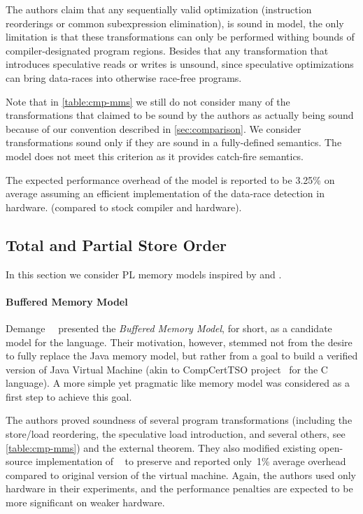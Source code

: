 The authors claim that any sequentially valid optimization 
(\eg instruction reorderings or common subexpression elimination),
is sound in \DRFx model, the only limitation is that
these transformations can only be performed
withing bounds of compiler-designated program regions.
Besides that any transformation that introduces 
speculative reads or writes is unsound,
since speculative optimizations can bring
data-races into otherwise race-free programs.

Note that in \cref{table:cmp-mms} we still do not consider 
many of the transformations that claimed to be sound by the authors
as actually being sound because of our convention described in \cref{sec:comparison}.
We consider transformations sound only if they are 
sound in a fully-defined semantics. 
The \DRFx model does not meet this criterion as 
it provides catch-fire semantics.

The expected performance overhead of the model 
is reported to be 3.25\% on average
assuming an efficient implementation 
of the data-race detection in hardware. 
(compared to stock compiler and \Intel hardware). 

\subsection{Total and Partial Store Order}

In this section we consider PL memory models 
inspired by \TSO and \PSO.  

\paragraph{Buffered Memory Model}

Demange~\etal~\cite{Demange-al:POPL13} presented 
the \emph{Buffered Memory Model}, \BMM for short,
as a candidate model for the \Java language.
Their motivation, however, stemmed not from the desire 
to fully replace the Java memory model, but rather 
from a goal to build a verified version of 
Java Virtual Machine (akin to CompCertTSO 
project~\cite{Sevcik-al:JACM13} for the C language).
A more simple yet pragmatic \TSO like memory model 
was considered as a first step to achieve this goal. 

The authors proved soundness of several program transformations
(including the store/load reordering, the speculative load introduction,
and several others, see \cref{table:cmp-mms})
and the external \DRF theorem. 
They also modified existing open-source implementation of 
\JVM~\cite{Pizlo-al:ECCS10} to preserve \BMM and 
reported only~1\% average overhead 
compared to original version of the virtual machine. 
Again, the authors used only \Intel hardware in their 
experiments, and the performance penalties 
are expected to be more significant on weaker hardware.   

